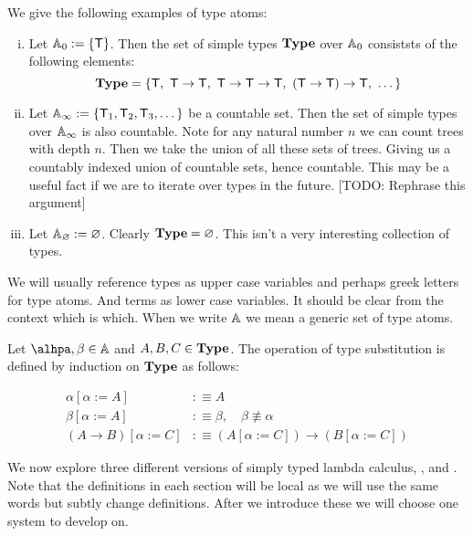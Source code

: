 \begin{example}
    We give the following examples of type atoms:
    \begin{enumerate}[(i)]
        \item Let $\mathbb{A}_0:=\{\mathsf{T}\}$. Then the set of simple types $\mathbf{Type}$ over $\mathbb{A}_0$  consiststs of the following elements: 
        $$\mathbf{Type} = \{ \mathsf{T},\ \mathsf{T} \to \mathsf{T},\ \mathsf{T} \to \mathsf{T} \to \mathsf{T},\ (\mathsf{T} \to \mathsf{T}) \to \mathsf{T},\ \dots \}$$
        
        \item Let $\mathbb{A}_\infty:=\{\mathsf{T}_1, \mathsf{T}_2, \mathsf{T}_3, \dots\}$ be a countable set. Then the set of simple types over $\mathbb{A}_\infty$ is also countable. Note for any natural number $n$ we can count trees with depth $n$. Then we take the union of all these sets of trees. Giving us a countably indexed union of countable sets, hence countable. This may be a useful fact if we are to iterate over types in the future. [TODO: Rephrase this argument]
        
        \item Let $\mathbb{A}_\varnothing:= \varnothing$. Clearly $\mathbf{Type} = \varnothing$. This isn't a very interesting collection of types.
    \end{enumerate}
\end{example}

\begin{remark}
    We will usually reference types as upper case variables and perhaps greek letters for type atoms. And terms as lower case variables. It should be clear from the context which is which. When we write $\mathbb{A}$ we mean a generic set of type atoms.
\end{remark}

\begin{defin}
Let $\alhpa,\beta \in \A$ and $A,B,C \in \mathbf{Type}$. The operation of type substitution is defined by induction on $\mathbf{Type}$ as follows:

\[\begin{aligned}
    \alpha[\alpha:=A] &:\equiv A \\
    \beta[\alpha:=A] &:\equiv \beta,\quad \beta\not\equiv \alpha \\
    (A \to B)[\alpha:=C] &:\equiv (A[\alpha:=C]) \to (B[\alpha:=C])
\end{aligned}\]


\end{defin}

We now explore three different versions of simply typed lambda calculus, \stcu, \stch and \stdb. Note that the definitions in each section will be local as we will use the same words but subtly change definitions. After we introduce these we will choose one system to develop on.


